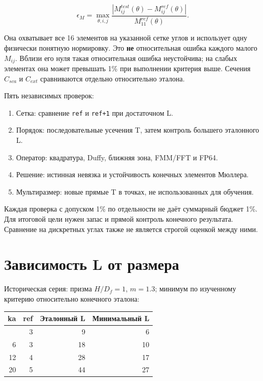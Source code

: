 \documentclass[
  russian,
  11pt,
  a4paper,
]{report}
\newcounter{none} %
\providecommand{\tightlist}{%
  \setlength{\itemsep}{0pt}\setlength{\parskip}{0pt}}
\begin{document}
\[\epsilon_M=\max_{\theta,i,j}
\frac{|M_{ij}^{test}(\theta)-M_{ij}^{ref}(\theta)|}{M_{11}^{ref}(\theta)}.\]

Она охватывает все 16 элементов на указанной сетке углов и использует
одну физически понятную нормировку. Это \textbf{не} относительная ошибка
каждого малого \(M_{ij}\). Вблизи его нуля такая относительная ошибка
неустойчива; на слабых элементах она может превышать 1\% при выполнении
критерия выше. Сечения \(C_{sca}\) и \(C_{ext}\) сравниваются отдельно
относительно эталона.

Пять независимых проверок:

\begin{enumerate}
\def\labelenumi{\arabic{enumi}.}
\tightlist
\item
  Сетка: сравнение \nolinkurl{ref} и \nolinkurl{ref+1} при достаточном
  L.
\item
  Порядок: последовательные усечения T, затем контроль большего
  эталонного L.
\item
  Оператор: квадратура, Duffy, ближняя зона, FMM/FFT и FP64.
\item
  Решение: истинная невязка и устойчивость конечных элементов Мюллера.
\item
  Мультиразмер: новые прямые T в точках, не использованных для обучения.
\end{enumerate}

Каждая проверка с допуском 1\% по отдельности не даёт суммарный бюджет
1\%. Для итоговой цели нужен запас и прямой контроль конечного
результата. Сравнение на дискретных углах также не является строгой
оценкой между ними.

\chapter{Зависимость L от
размера}\label{ux437ux430ux432ux438ux441ux438ux43cux43eux441ux442ux44c-l-ux43eux442-ux440ux430ux437ux43cux435ux440ux430}

Историческая серия: призма \(H/D_f=1\), \(m=1.3\); минимум по изученному
критерию относительно конечного эталона:

{\def\LTcaptype{none} %
\begin{longtable}[]{@{}rrrr@{}}
\toprule\noalign{}
ka & ref & Эталонный L & Минимальный L \\
\midrule\noalign{}
\endhead
\bottomrule\noalign{}
\endlastfoot
3 & 3 & 9 & 6 \\
6 & 3 & 18 & 10 \\
12 & 4 & 28 & 17 \\
20 & 5 & 44 & 27 \\
\end{longtable}
}
\end{document}
